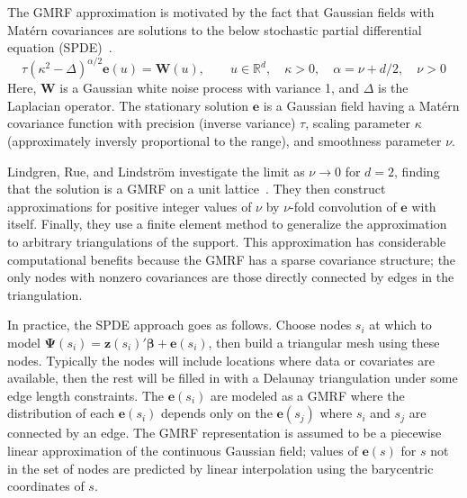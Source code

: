 \documentclass[]{interact}
\begin{document}
The GMRF approximation is motivated by the fact that Gaussian fields with
Mat\'{e}rn covariances are solutions to the below stochastic partial
differential equation (SPDE)~\cite{lindgrenetal}.
\begin{displaymath}
\tau(\kappa^{2} - \Delta)^{\alpha / 2} \mathbf{e}(u) = \mathbf{W}(u),
\qquad u \in \mathbb{R}^d, \quad \kappa > 0,
\quad \alpha = \nu + d/2, \quad \nu > 0
\end{displaymath}
Here, \(\mathbf{W}\) is a Gaussian white noise process with variance 1, and
\(\Delta\) is the Laplacian operator. The stationary solution
\(\mathbf{e}\) is a Gaussian field having a Mat\'{e}rn covariance
function with precision (inverse variance) \(\tau\),  scaling parameter
\(\kappa\) (approximately inversly proportional to the range), and smoothness
parameter \(\nu\).

Lindgren, Rue, and Lindstr\"{o}m investigate the limit as \(\nu \to 0\) for
\(d = 2\), finding that the solution is a GMRF on a unit
lattice~\cite{lindgrenetal}. They then construct approximations for positive
integer values of \(\nu\) by \(\nu\)-fold convolution of \(\mathbf{e}\)
with itself. Finally, they use a finite element method to generalize the
approximation to arbitrary triangulations of the support. This approximation
has considerable computational benefits because the GMRF has a sparse
covariance structure; the only nodes with nonzero covariances are those
 directly connected by edges in the triangulation.

In practice, the SPDE approach goes as follows. Choose nodes \(s_{i}\)
at which to model \(\boldsymbol{\Psi}(s_{i})
= \mathbf{z}(s_{i})' \boldsymbol{\beta} + \mathbf{e}(s_{i})\), then build a
triangular mesh using these nodes. Typically the nodes will include locations
where data or covariates are available, then the rest will be filled in with a
Delaunay triangulation under some edge length constraints. The
\(\mathbf{e}(s_{i})\) are modeled as a GMRF where the distribution of
each \(\mathbf{e}(s_{i})\) depends only on the
\(\mathbf{e}(s_{j})\) where \(s_{i}\) and \(s_{j}\) are connected by an
edge. The GMRF representation is assumed to be a piecewise linear approximation
of the continuous Gaussian field; values of \(\mathbf{e}(s)\) for
\(s\) not in the set of nodes are predicted by linear interpolation using
the barycentric coordinates of \(s\).


\end{document}
